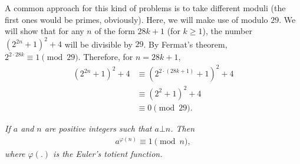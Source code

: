 \documentclass{subfile}
\begin{document}
		\begin{solution}
			A common approach for this kind of problems is to take different moduli (the first ones would be primes, obviously). Here, we will make use of modulo $29$. We will show that for any $n$ of the form $28k+1$ (for $k \geq 1$), the number $(2^{2n}+1 )^2+4$ will be divisible by $29$. By Fermat's theorem, $2^{2 \cdot 28k} \equiv 1 \pmod{29}$. Therefore, for $n=28k+1$, 
				\begin{align*}
					(2^{2n}+1 )^2+4 &\equiv (2^{2\cdot (28k+1)}+1 )^2+4\\
									&\equiv (2^{2}+1 )^2+4\\
									&\equiv 0 \pmod{29}.
				\end{align*}
			
		\end{solution}
	
		\begin{theorem}\slshape
			If $a$ and $n$ are positive integers such that $a \bot n$. Then
			\begin{align*}
			a^{\varphi(n)} \equiv 1 \pmod n,
			\end{align*}
			where $\varphi(.)$ is the Euler's totient function.
		\end{theorem}
\end{document}
